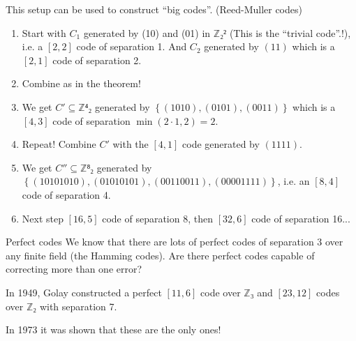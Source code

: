 \documentclass[english]{lbscript}
\begin{document}
\begin{remark}{}{}
  This setup can be used to construct \enquote{big codes}. (Reed-Muller codes)

  \begin{enumerate}
    \item\label{item:82} Start with \(C_1\) generated by (10) and (01) in \(ℤ₂²\) (This is the \enquote{trivial code}.!), i.e. a \([2,2]\) code of separation 1. And \(C_2\) generated by \((11)\) which is a \([2,1]\) code of separation 2.
    \item\label{item:83} Combine as in the theorem!
    \item\label{item:84} We get \(C'⊆ℤ⁴₂\) generated by \(\left\{ (1010), (0101),(0011) \right\} \) which is a \([4,3]\) code of separation \(\min(2⋅1, 2)=2\).
    \item\label{item:85} Repeat! Combine \(C'\) with the \([4,1]\) code generated by \((1111)\).
    \item\label{item:86} We get \(C''⊆ℤ⁸₂\) generated by \(\left\{ (10101010), (01010101), (00110011), (00001111) \right\} \), i.e. an \([8,4]\) code of separation 4.
    \item\label{item:87} Next step \([16,5]\) code of separation 8, then \([32, 6]\) code of separation 16...
  \end{enumerate}
\end{remark}
\begin{remark}{Perfect codes}{}
  We know that there are lots of perfect codes of separation 3 over any finite field (the Hamming codes). Are there perfect codes capable of correcting more than one error?

  In 1949, Golay constructed a perfect \([11,6]\) code over \(ℤ₃\) and \([23,12]\) codes over \(ℤ₂\) with separation 7.

  In 1973 it was shown that these are the only ones!
\end{remark}
\end{document}
